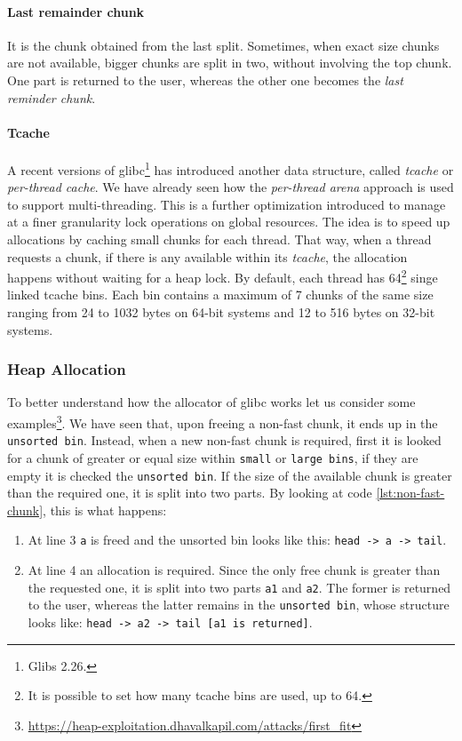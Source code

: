 \documentclass{article}
\numberwithin{equation}{subsection}
\begin{document}
\paragraph{Last remainder chunk}
It is the chunk obtained from the last split. Sometimes, when exact size chunks are not available, bigger chunks are split in two, without involving the top chunk. One part is returned to the user, whereas the other one becomes the \emph{last reminder chunk}.
\paragraph{Tcache}
A recent versions of glibc\footnote{Glibs 2.26.} has introduced another data structure, called \emph{tcache} or \emph{per-thread cache}. We have already seen how the \emph{per-thread arena} approach is used to support multi-threading. This is a further optimization introduced to manage at a finer granularity lock operations on global resources. The idea is to speed up allocations by caching small chunks for each thread. That way, when a thread requests a chunk, if there is any available within its \emph{tcache},  the allocation happens without waiting for a heap lock. By default, each thread has 64\footnote{It is possible to set how many tcache bins are used, up to 64.} singe linked tcache bins. Each bin contains a maximum of 7 chunks of the same size ranging from 24 to 1032 bytes on 64-bit systems and 12 to 516 bytes on 32-bit systems.
\subsubsection{Heap Allocation}
To better understand how the allocator of glibc works let us consider some examples\footnote{\href{https://heap-exploitation.dhavalkapil.com/attacks/first_fit}{https://heap-exploitation.dhavalkapil.com/attacks/first\_fit}}. We have seen that, upon freeing a non-fast chunk, it ends up in the \texttt{unsorted bin}. Instead, when a new non-fast chunk is required, first it is looked for a chunk of greater or equal size within \texttt{small} or \texttt{large bins}, if they are empty it is checked the \texttt{unsorted bin}. If the size of the available chunk is greater than the required one, it is split into two parts.\newline
\noindent
By looking at code \ref{lst:non-fast-chunk}, this is what happens:
\begin{enumerate}
    \item At line 3 \texttt{a} is freed and the unsorted bin looks like this: \texttt{head -> a -> tail}.
    \item At line 4 an allocation is required. Since the only free chunk is greater than the requested one, it is split into two parts \texttt{a1} and \texttt{a2}. The former is returned to the user, whereas the latter remains in the \texttt{unsorted bin}, whose structure looks like:\newline
    \texttt{head -> a2 -> tail [a1 is returned]}.
\end{enumerate}
\end{document}
